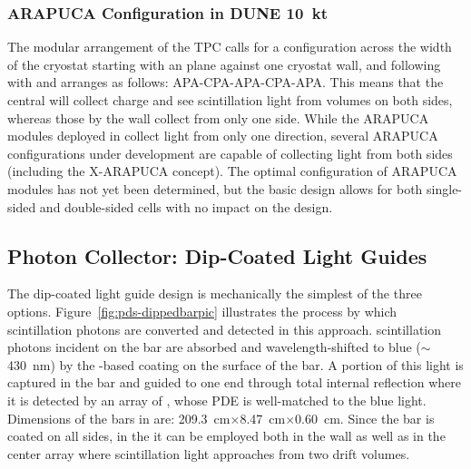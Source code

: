 \subsubsection{ARAPUCA Configuration in DUNE \SI{10}{kt} }
\label{sssec:arapuca-dune}

The modular arrangement of the  TPC calls for a configuration across the width of the cryostat starting with an  plane against one cryostat wall, and following with  and  arranges as follows:  APA-CPA-APA-CPA-APA. This means that the central  will collect charge and see scintillation light from \lar volumes on both sides, whereas those by the wall collect from only one side.  
While the ARAPUCA modules deployed in  collect light from only one direction, several ARAPUCA configurations under development are capable of collecting light from both sides (including the X-ARAPUCA concept).
The optimal configuration of ARAPUCA modules has not yet been determined, but the basic design allows for both single-sided and double-sided cells with no impact on the  design.



\subsection{Photon Collector: Dip-Coated Light Guides}
\label{ssec:fdsp-pd-pc-bar1}


The dip-coated light guide design is mechanically the simplest of the three options. Figure~\ref{fig:pds-dippedbarpic} illustrates the process by which \lar scintillation photons are converted and detected in this approach.   scintillation photons incident on the bar are absorbed and wavelength-shifted to blue ($\sim$\SI{430}{nm}) by the -based coating on the surface of the bar.  A portion of this light is captured in the bar and guided to one end through total internal reflection where it is detected by an array of , whose PDE is well-matched to the blue light.  Dimensions of the bars in  are: \SI{209.3}{cm}$\times$\SI{8.47}{cm}$\times$\SI{0.60}{cm}.
Since the bar is coated on all sides, in the  it can be employed both in the wall  as well as in the center  array where scintillation light approaches from two drift volumes.

